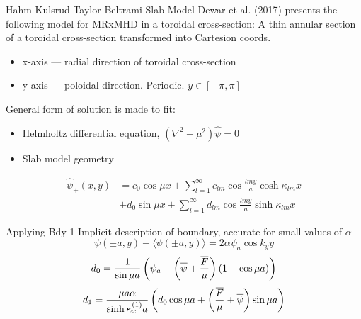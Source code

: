 \documentclass{beamer}
\begin{document}
\begin{frame}[t]
\begin{textblock}{15}
{\begin{block}{Hahm-Kulsrud-Taylor Beltrami Slab Model}
Dewar et al. (2017) presents the following model for MRxMHD in a toroidal cross-section:
A thin annular section of a toroidal cross-section transformed into Cartesion coords.
\begin{itemize}
    \item x-axis --- radial direction of toroidal cross-section
    \item y-axis --- poloidal direction. Periodic. $y \in [-\pi,\pi]$
\end{itemize}
General form of solution is made to fit:
\begin{itemize}
    \item Helmholtz differential equation, $\left( \nabla^2 + \mu^2 \right) \hat{\psi}=0$
    \item Slab model geometry
\end{itemize}

\begin{equation}
    \begin{split}
        \hat{\psi}_+ (x,y) & = c_0\cos{\mu x} + \sum_{l=1}^{\infty} c_{lm} \cos{\frac{lmy}{a}} \cosh{\kappa_{lm} x} \\
                           & + d_0 \sin{\mu x} + \sum_{l=1}^{\infty} d_{lm} \cos{\frac{lmy}{a}} \sinh{\kappa_{lm} x}
    \end{split}
\end{equation} 

\end{block}
}

\begin{block}{Applying Bdy-1}
Implicit description of boundary, accurate for small values of $\alpha$
\begin{equation}
    \label{eq:bdy1}
    \psi\left( \pm a, y \right) - \langle \psi\left( \pm a, y \right) \rangle = 2\alpha \psi_a \cos{k_y y}
\end{equation} 
\begin{equation}
    d_0=\frac{1}{\sin{\mu a}} \left(\psi_a - \left(\overline{\psi} + \frac{\overline{F}}{\mu}\right)(1-\cos{\mu a})\right)
\end{equation} 
\begin{equation}
d_1=\frac{\mu a \alpha}{\sinh{\kappa^{(1)}_x a}}\left(d_0\cos{\mu a} + \left(\frac{\overline{F}}{\mu}    + \overline{\psi}\right)\sin{\mu a}\right)
\end{equation} 

\end{block}


\end{textblock}
\end{frame}
\end{document}
